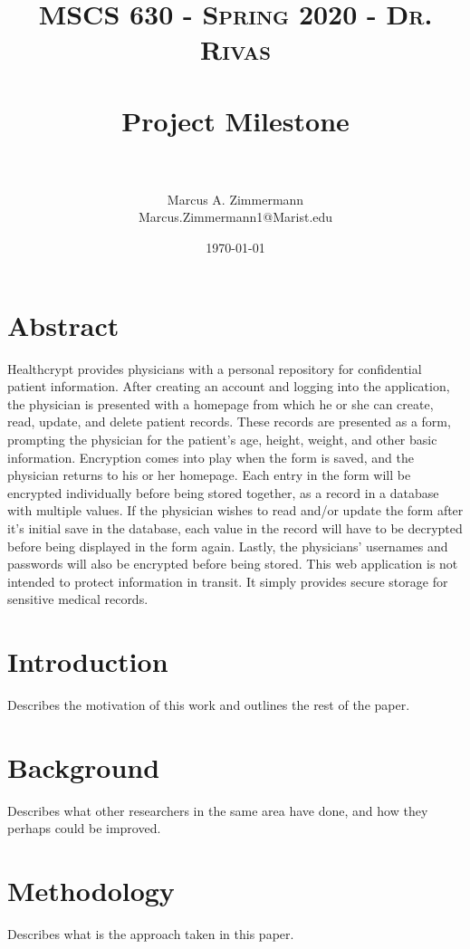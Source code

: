 \documentclass[letterpaper, 10pt,DIV=13]{scrartcl}
\title{	
   \normalfont \normalsize
   \textsc{MSCS 630 - Spring 2020 - Dr. Rivas} \\ [10pt] %
   \horrule{0.5pt} \\[0.25cm] 	%
   \huge Project Milestone  \\     	    %
   \horrule{0.5pt} \\[0.25cm] 	%
}
\author{Marcus A. Zimmermann \\ \normalsize Marcus.Zimmermann1@Marist.edu}
\date{\normalsize\today} 	%
\numberwithin{equation}{section} %
\numberwithin{figure}{section} %
\numberwithin{table}{section} %
\begin{document}
\maketitle %

\section*{Abstract}
\begin{spacing}{1.25}
Healthcrypt provides physicians with a personal repository for confidential patient information. After creating an account and logging into the application, the physician is presented with a homepage from which he or she can create, read, update, and delete patient records. These records are presented as a form, prompting the physician for the patient's age, height, weight, and other basic information. Encryption comes into play when the form is saved, and the physician returns to his or her homepage. Each entry in the form will be encrypted individually before being stored together, as a record in a database with multiple values. If the physician wishes to read and/or update the form after it's initial save in the database, each value in the record will have to be decrypted before being displayed in the form again. Lastly, the physicians' usernames and passwords will also be encrypted before being stored. This web application is not intended to protect information in transit. It simply provides secure storage for sensitive medical records.
\end{spacing}

\section*{Introduction}
\begin{spacing}{1.25}
Describes the motivation of this work and outlines the rest of the paper.
\end{spacing}

\section*{Background}
\begin{spacing}{1.25}
Describes what other researchers in the same area have done, and how they perhaps could be improved.
\end{spacing}

\section*{Methodology}
\begin{spacing}{1.25}
Describes what is the approach taken in this paper.
\end{spacing}
\end{document}
